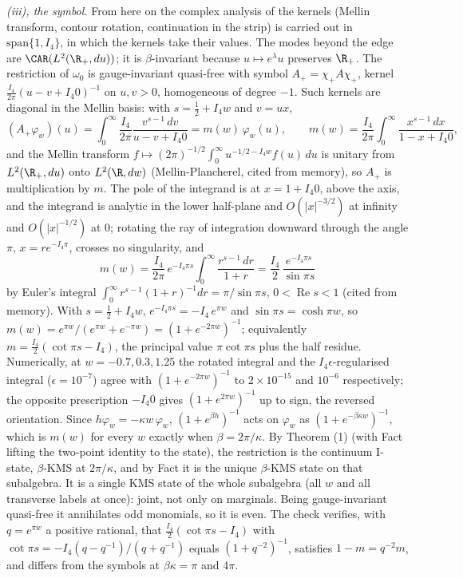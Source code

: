 \emph{(iii), the symbol.} From here on the complex analysis of the kernels (Mellin transform, contour rotation, continuation in the strip) is carried out in $\mathrm{span}\{1, I_{4}\}$, in which the kernels take their values. The modes beyond the edge are $\CAR(L^{2}(\R_{+}, du))$; it is $\beta$-invariant because $u \mapsto e^{\lambda}u$ preserves $\R_{+}$. The restriction of $\omega_{0}$ is gauge-invariant quasi-free with symbol $A_{+} = \chi_{+}A\chi_{+}$, kernel $\tfrac{I_{4}}{2\pi}(u - v + I_{4}0)^{-1}$ on $u, v > 0$, homogeneous of degree $-1$. Such kernels are diagonal in the Mellin basis: with $s = \tfrac12 + I_{4}w$ and $v = ux$,
\[
(A_{+}\varphi_{w})(u) = \int_{0}^{\infty}\frac{I_{4}}{2\pi}\frac{v^{s-1}\,dv}{u - v + I_{4}0} = m(w)\,\varphi_{w}(u), \qquad m(w) = \frac{I_{4}}{2\pi}\int_{0}^{\infty}\frac{x^{s-1}\,dx}{1 - x + I_{4}0} ,
\]
and the Mellin transform $f \mapsto (2\pi)^{-1/2}\int_{0}^{\infty}u^{-1/2 - I_{4}w}f(u)\,du$ is unitary from $L^{2}(\R_{+}, du)$ onto $L^{2}(\R, dw)$ (Mellin-Plancherel, cited from memory), so $A_{+}$ is multiplication by $m$. The pole of the integrand is at $x = 1 + I_{4}0$, above the axis, and the integrand is analytic in the lower half-plane and $O(|x|^{-3/2})$ at infinity and $O(|x|^{-1/2})$ at $0$; rotating the ray of integration downward through the angle $\pi$, $x = re^{-I_{4}\pi}$, crosses no singularity, and
\[
m(w) = \frac{I_{4}}{2\pi}\,e^{-I_{4}\pi s}\int_{0}^{\infty}\frac{r^{s-1}\,dr}{1 + r} = \frac{I_{4}}{2}\,\frac{e^{-I_{4}\pi s}}{\sin\pi s}
\]
by Euler's integral $\int_{0}^{\infty}r^{s-1}(1 + r)^{-1}dr = \pi/\sin\pi s$, $0 < \operatorname{Re}s < 1$ (cited from memory). With $s = \tfrac12 + I_{4}w$, $e^{-I_{4}\pi s} = -I_{4}\,e^{\pi w}$ and $\sin\pi s = \cosh\pi w$, so $m(w) = e^{\pi w}/(e^{\pi w} + e^{-\pi w}) = (1 + e^{-2\pi w})^{-1}$; equivalently $m = \tfrac{I_{4}}{2}(\cot\pi s - I_{4})$, the principal value $\pi\cot\pi s$ plus the half residue. Numerically, at $w = -0.7, 0.3, 1.25$ the rotated integral and the $I_{4}\epsilon$-regularised integral ($\epsilon = 10^{-7}$) agree with $(1 + e^{-2\pi w})^{-1}$ to $2\times 10^{-15}$ and $10^{-6}$ respectively; the opposite prescription $-I_{4}0$ gives $(1 + e^{2\pi w})^{-1}$ up to sign, the reversed orientation. Since $h\varphi_{w} = -\kappa w\,\varphi_{w}$, $(1 + e^{\beta h})^{-1}$ acts on $\varphi_{w}$ as $(1 + e^{-\beta\kappa w})^{-1}$, which is $m(w)$ for every $w$ exactly when $\beta = 2\pi/\kappa$. By Theorem (1) (with Fact  lifting the two-point identity to the state), the restriction is the continuum I-state, $\beta$-KMS at $2\pi/\kappa$, and by Fact  it is the unique $\beta$-KMS state on that subalgebra. It is a single KMS state of the whole subalgebra (all $w$ and all transverse labels at once): joint, not only on marginals. Being gauge-invariant quasi-free it annihilates odd monomials, so it is even. The check verifies, with $q = e^{\pi w}$ a positive rational, that $\tfrac{I_{4}}{2}(\cot\pi s - I_{4})$ with $\cot\pi s = -I_{4}(q - q^{-1})/(q + q^{-1})$ equals $(1 + q^{-2})^{-1}$, satisfies $1 - m = q^{-2}m$, and differs from the symbols at $\beta\kappa = \pi$ and $4\pi$.

